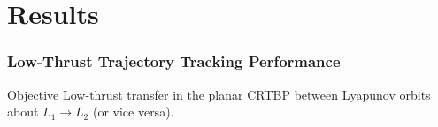 \section{Results}

\begin{frame}
  \frametitle{Low-Thrust Trajectory Tracking Performance}
  \vspace{-0.3cm}
  \begin{minipage}
        {\textwidth}
  \begin{block}{Objective}
    Low-thrust transfer in the planar CRTBP between Lyapunov orbits about $L_1 \rightarrow L_2$ (or vice versa).
  \end{block}
  \end{minipage}
  \vspace{0.3cm}
  \begin{columns}[T]
    \begin{column}{0.52\textwidth}


\end{column}
\end{columns}
\end{frame}
